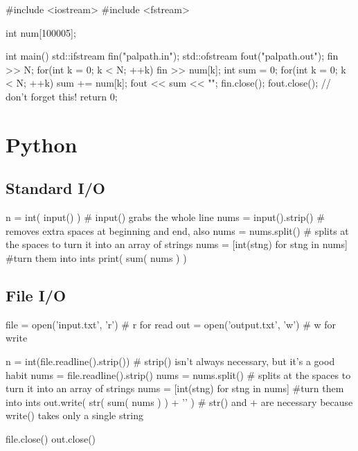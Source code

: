 \documentclass{article}
\begin{document}
\begin{mylstlisting}
#include <iostream>
#include <fstream>

int num[100005];

int main() {
	std::ifstream fin("palpath.in");
	std::ofstream fout("palpath.out");
	fin >> N;
	for(int k = 0; k < N; ++k) {
		fin >> num[k];
	}
	int sum = 0;
	for(int k = 0; k < N; ++k) {
		sum += num[k];
	}
	fout << sum << "\n";
	fin.close();
	fout.close(); // don't forget this!
	return 0;
}
\end{mylstlisting}

\section{Python}

\lstset{language=Python}

\subsection{Standard I/O}

\begin{mylstlisting}
n = int( input() ) # input() grabs the whole line
nums = input().strip() # removes extra spaces at beginning and end, also \n
nums = nums.split() # splits at the spaces to turn it into an array of strings
nums = [int(stng) for stng in nums] #turn them into ints
print( sum( nums ) )
\end{mylstlisting}

\subsection{File I/O}

\begin{mylstlisting}
file = open('input.txt', 'r') # r for read
out = open('output.txt', 'w') # w for write

n = int(file.readline().strip()) # strip() isn't always necessary, but it's a good habit
nums = file.readline().strip()
nums = nums.split() # splits at the spaces to turn it into an array of strings
nums = [int(stng) for stng in nums] #turn them into ints
out.write( str( sum( nums ) ) + '\n' ) # str() and + are necessary because write() takes only a single string

file.close()
out.close()
\end{mylstlisting}
\end{document}
